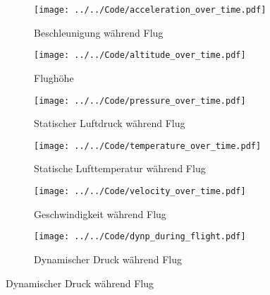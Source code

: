 \begin{figure}[H]
    \centering

    \begin{subfigure}{0.48\textwidth}
        \centering
        \texttt{[image: ../../Code/acceleration\_over\_time.pdf]}
        \caption{Beschleunigung während Flug}
        \label{fig:acceleration_over_time}
    \end{subfigure}
    \hfill
    \begin{subfigure}{0.48\textwidth}
        \centering
        \texttt{[image: ../../Code/altitude\_over\_time.pdf]}
        \caption{Flughöhe}
        \label{fig:altitude_over_time}
    \end{subfigure}

    \vspace{1em}

    \begin{subfigure}{0.48\textwidth}
        \centering
        \texttt{[image: ../../Code/pressure\_over\_time.pdf]}
        \caption{Statischer Luftdruck während Flug}
        \label{fig:pressure_over_time}
    \end{subfigure}
    \hfill
    \begin{subfigure}{0.48\textwidth}
        \centering
        \texttt{[image: ../../Code/temperature\_over\_time.pdf]}
        \caption{Statische Lufttemperatur während Flug}
        \label{fig:temperature_over_time}
    \end{subfigure}

    \vspace{1em}

    \begin{subfigure}{0.48\textwidth}
        \centering
        \texttt{[image: ../../Code/velocity\_over\_time.pdf]}
        \caption{Geschwindigkeit während Flug}
        \label{fig:velocity_over_time}
    \end{subfigure}
    \hfill
    \begin{subfigure}{0.48\textwidth}
        \centering
        \texttt{[image: ../../Code/dynp\_during\_flight.pdf]}
        \caption{Dynamischer Druck während Flug}
        \label{fig:dynp_over_time}
    \end{subfigure}

\end{figure}

